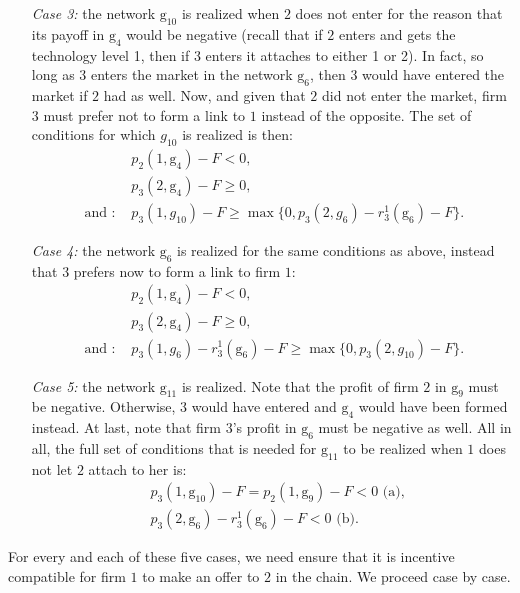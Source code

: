 \documentclass{article}
\begin{document}
\begin{enumerate}
   \item[\textit{Case 3:}] the network $\text{g}_{10}$ is realized when $2$ does not enter for the reason that its payoff in $\text{g}_4$ would be negative (recall that if $2$ enters and gets the technology level 1, then if 3 enters it attaches to either 1 or 2). In fact, so long as $3$ enters the market in the network $\text{g}_6$, then $3$ would have entered the market if $2$ had as well. Now, and given that $2$ did not enter the market, firm $3$ must prefer not to form a link to $1$ instead of the opposite. The set of conditions for which $g_{10}$ is realized is then:
   \begin{align*}
      & p_2(1,\text{g}_4)-F<0,\\
      & p_3(2,\text{g}_4)-F\geq 0,\\
       \mbox{ and : } & p_3(1,g_{10})-F \geq \max\{0, p_3(2,g_{6})-r^1_3(\text{g}_6)-F\}.
   \end{align*}
    \item[\textit{Case 4:}] the network $\text{g}_6$ is realized for the same conditions as above, instead that $3$ prefers now to form a link to firm $1$:
     \begin{align*}
      & p_2(1,\text{g}_4)-F<0,\\
      & p_3(2,\text{g}_4)-F\geq 0,\\
       \mbox{ and : } & p_3(1,g_6)-r^1_3(\text{g}_6)-F \geq \max\{0, p_3(2,g_{10})-F\}.
   \end{align*}
  \item[\textit{Case 5:}] the network $\text{g}_{11}$ is realized. Note that the profit of firm $2$ in $\text{g}_9$ must be negative. Otherwise, $3$ would have entered and $\text{g}_4$ would have been formed instead. At last, note that firm $3$'s profit in $\text{g}_6$ must be negative as well. All in all, the full set of conditions that is needed for $\text{g}_{11}$ to be realized when $1$ does not let $2$ attach to her is: 
  \begin{align*}
      & p_3(1,\text{g}_{10})-F=p_2(1,\text{g}_9)-F<0 \mbox{ (a),}\\
      & p_3(2,\text{g}_6)-r^1_3(\text{g}_6)-F <0 \mbox{ (b).}
  \end{align*}
\end{enumerate}

For every and each of these five cases, we need ensure that it is incentive compatible for firm $1$ to make an offer to $2$ in the chain. We proceed case by case. \\
\end{document}
